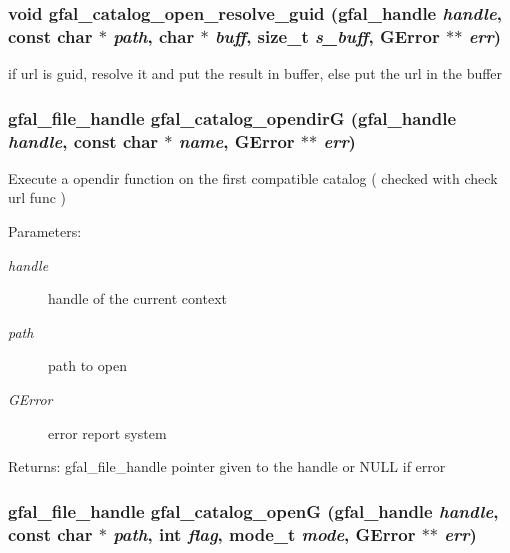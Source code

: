 \subsubsection{\setlength{\rightskip}{0pt plus 5cm}void gfal\_\-catalog\_\-open\_\-resolve\_\-guid (gfal\_\-handle {\em handle}, const char $\ast$ {\em path}, char $\ast$ {\em buff}, size\_\-t {\em s\_\-buff}, GError $\ast$$\ast$ {\em err})}\label{gfal__common__catalog_8c_453f66b6e25bc2e9171d710357b8e899}


if url is guid, resolve it and put the result in buffer, else put the url in the buffer 
\subsubsection{\setlength{\rightskip}{0pt plus 5cm}gfal\_\-file\_\-handle gfal\_\-catalog\_\-opendir\-G (gfal\_\-handle {\em handle}, const char $\ast$ {\em name}, GError $\ast$$\ast$ {\em err})}\label{gfal__common__catalog_8c_eb89b1d37a16ef8ecb50ac603366285c}


Execute a opendir function on the first compatible catalog ( checked with check url func ) \begin{Desc}
\item[Parameters:]
\begin{description}
\item[{\em handle}]handle of the current context \item[{\em path}]path to open \item[{\em GError}]error report system \end{description}
\end{Desc}
\begin{Desc}
\item[Returns:]gfal\_\-file\_\-handle pointer given to the handle or NULL if error \end{Desc}
\subsubsection{\setlength{\rightskip}{0pt plus 5cm}gfal\_\-file\_\-handle gfal\_\-catalog\_\-open\-G (gfal\_\-handle {\em handle}, const char $\ast$ {\em path}, int {\em flag}, mode\_\-t {\em mode}, GError $\ast$$\ast$ {\em err})}\label{gfal__common__catalog_8c_cd4cabbd5effdf20bc0b20345c5cc4ab}



